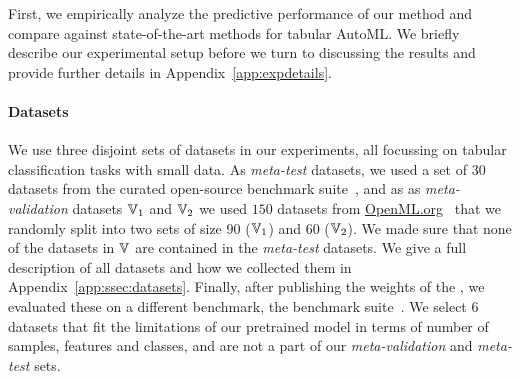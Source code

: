 \documentclass{article}
\begin{document}
First, we empirically analyze the predictive performance of our method
and compare against state-of-the-art methods for tabular AutoML. We briefly describe our experimental setup before we turn to discussing the results and provide further details in Appendix~\ref{app:expdetails}.


\paragraph{Datasets} We use three disjoint sets of datasets in our experiments, all focussing on tabular classification tasks with small data. 
As \textit{meta-test} datasets, we used a set of $30$ datasets from the curated open-source \openmlcc{} benchmark suite~\citep{bischl-neuripsdbt21a}, and as as \textit{meta-validation} datasets $\mathbb{V}_1$ and $\mathbb{V}_2$ we used $150$ datasets from \url{OpenML.org}~\citep{vanschoren-sigkdd14a} that we randomly split into two sets of size 90 ($\mathbb{V}_1$) and 60 ($\mathbb{V}_2$). 
We made sure that none of the datasets in $\mathbb{V}$ are contained in the \textit{meta-test} datasets.
We give a full description of all datasets and how we collected them in Appendix~\ref{app:ssec:datasets}.
Finally, after publishing the weights of the \methodname{}, we evaluated these on a different benchmark, the \openmlautoml{} benchmark suite~\citep{amlb}. We select 6 datasets that fit the limitations of our pretrained model in terms of number of samples, features and classes, and are not a part of our \textit{meta-validation} and \textit{meta-test} sets.
%
%
\end{document}
